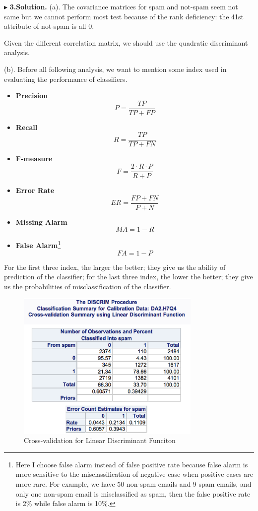 \documentclass[letterpaper, 12pt]{article}
\begin{document}
$\blacktriangleright$ \textbf{3.\quad Solution.} 
(a). The covariance matrices for spam and not-spam seem not same but we cannot perform most test because of the rank deficiency: the 41st attribute of not-spam is all 0.

Given the different correlation matrix, we should use the quadratic discriminant analysis. 





(b). Before all following analysis, we want to mention some index used in evaluating the performance of classifiers.
\begin{itemize}
\item \textbf{Precision}
$$
P=\frac{TP}{TP+FP}
$$
\item \textbf{Recall}
$$
R=\frac{TP}{TP+FN}
$$
\item \textbf{F-measure}
$$
F=\frac{2\cdot R\cdot P}{R+P}
$$
\item \textbf{Error Rate}
$$
ER=\frac{FP+FN}{P+N}
$$
\item \textbf{Missing Alarm}
$$
MA=1-R
$$
\item \textbf{False Alarm}\footnote{Here I choose false alarm instead of false positive rate because false alarm is more sensitive to the misclassification of negative case when positive cases are more rare. For example, we have 50 non-spam emails and 9 spam emails, and only one non-spam email is misclassified as spam, then the false positive rate is 2\% while false alarm is 10\%.}
$$
FA=1-P
$$
\end{itemize}

For the first three index, the larger the better; they give us the ability of prediction of the classifier; for the last three index, the lower the better; they give us the probabilities of misclassification of the classifier.
\begin{figure}[htbp]
\centering\includegraphics[width=3.5in]{7-100.eps}
\caption{Cross-validation for Linear Discriminant Funciton}\label{100}
\end{figure}
\end{document}
